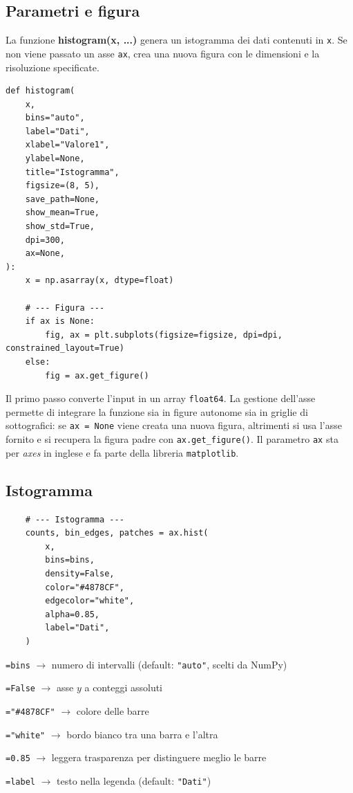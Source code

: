 \subsection{Parametri e figura}
La funzione \textbf{histogram(x, ...)} genera un istogramma dei dati contenuti in \texttt{x}. Se non viene passato un asse \texttt{ax}, crea una nuova figura con le dimensioni e la risoluzione specificate.
\begin{verbatim}
def histogram(
    x,
    bins="auto",
    label="Dati",
    xlabel="Valore1",
    ylabel=None,
    title="Istogramma",
    figsize=(8, 5),
    save_path=None,
    show_mean=True,
    show_std=True,
    dpi=300,
    ax=None,
):
    x = np.asarray(x, dtype=float)

    # --- Figura ---
    if ax is None:
        fig, ax = plt.subplots(figsize=figsize, dpi=dpi, constrained_layout=True)
    else:
        fig = ax.get_figure()
\end{verbatim}

Il primo passo converte l'input in un array \texttt{float64}. La gestione dell'asse permette di integrare la funzione sia in figure autonome sia in griglie di sottografici: se \texttt{ax = None} viene creata una nuova figura, altrimenti si usa l'asse fornito e si recupera la figura padre con \texttt{ax.get\_figure()}. Il parametro \texttt{ax} sta per \textit{axes} in inglese e fa parte della libreria \texttt{matplotlib}.
\newpage
\subsection{Istogramma}
\begin{verbatim}
    # --- Istogramma ---
    counts, bin_edges, patches = ax.hist(
        x,
        bins=bins,
        density=False,
        color="#4878CF",
        edgecolor="white",
        alpha=0.85,
        label="Dati",
    )
\end{verbatim}


\begin{apidesc}
  \item[\textbf{Parametri}]\hfill
    \begin{description}[font=\normalfont\ttfamily\bfseries, labelwidth=5em, leftmargin=5.5em, itemsep=1pt, parsep=0pt, topsep=3pt]
      \item[bins]      \texttt{=bins} $\to$ numero di intervalli (default: \texttt{"auto"}, scelti da NumPy)
      \item[density]   \texttt{=False} $\to$ asse $y$ a conteggi assoluti
      \item[color]     \texttt{="\#4878CF"} $\to$ colore delle barre
      \item[edgecolor] \texttt{="white"} $\to$ bordo bianco tra una barra e l'altra
      \item[alpha]     \texttt{=0.85} $\to$ leggera trasparenza per distinguere meglio le barre
      \item[label]     \texttt{=label} $\to$ testo nella legenda (default: \texttt{"Dati"})
    \end{description}
\end{apidesc}

